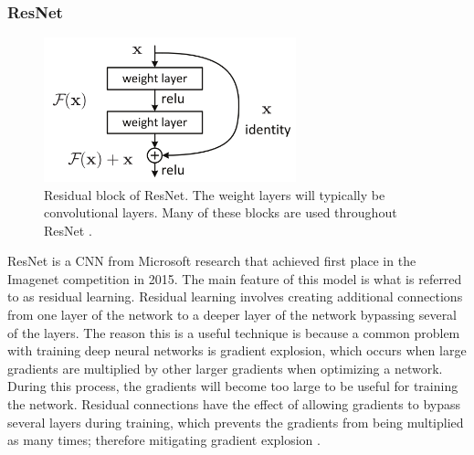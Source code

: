 \subsubsection{ResNet}
\begin{figure}
    \centering
    \includegraphics[width=0.65\textwidth]{images/residual.png}
    \caption{Residual block of ResNet. The weight layers will typically be convolutional layers. Many of these blocks are used throughout ResNet \cite{resnet}.}
    \label{residual}
\end{figure}
ResNet is a CNN from Microsoft research that achieved first place in the Imagenet competition in 2015. The main feature of this model is what is referred to as residual learning. Residual learning involves creating additional connections from one layer of the network to a deeper layer of the network bypassing several of the layers. The reason this is a useful technique is because a common problem with training deep neural networks is gradient explosion, which occurs when large gradients are multiplied by other larger gradients when optimizing a network. During this process, the gradients will become too large to be useful for training the network. Residual connections have the effect of allowing gradients to bypass several layers during training, which prevents the gradients from being multiplied as many times; therefore mitigating gradient explosion \cite{resnet}.

